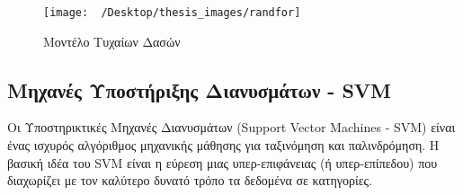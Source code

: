 \documentclass[diploma]{softlab-thesis}
\begin{document}
\begin{figure}[h]
    \centering
    \texttt{[image: ~/Desktop/thesis\_images/randfor]} %
    \caption{Μοντέλο Τυχαίων Δασών}
    \label{fig:your_image_label}
\end{figure}


\subsection{Μηχανές Υποστήριξης Διανυσμάτων - SVM}

Οι Υποστηρικτικές Μηχανές Διανυσμάτων (Support Vector Machines - SVM) είναι ένας ισχυρός αλγόριθμος μηχανικής μάθησης για ταξινόμηση και παλινδρόμηση. Η βασική ιδέα του SVM είναι η εύρεση μιας υπερ-επιφάνειας (ή υπερ-επίπεδου) που διαχωρίζει με τον καλύτερο δυνατό τρόπο τα δεδομένα σε κατηγορίες.
\end{document}
